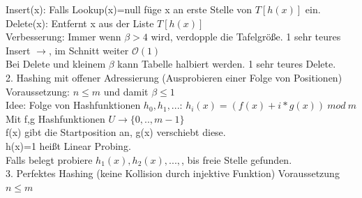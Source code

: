 \documentclass[a4paper]{article}
\newcommand{\oh}[1]{$\mathcal{O}(#1)$}
\begin{document}
Insert(x): Falls Lookup(x)=null füge x an erste Stelle von $T[h(x)]$ ein. \\
Delete(x): Entfernt x aus der Liste $T[h(x)]$\\
Verbesserung: Immer wenn $\beta >4 $ wird, verdopple die Tafelgröße. 1 sehr teures Insert $\rightarrow$, im Schnitt weiter \oh{1}\\
Bei Delete und kleinem $\beta$ kann Tabelle halbiert werden. 1 sehr teures Delete.\\
2. Hashing mit offener Adressierung (Ausprobieren einer Folge von Positionen)\\
Voraussetzung: $n\leq m$ und damit $\beta \leq 1$\\
Idee: Folge von Hashfunktionen $h_0, h_1,...$: $h_i(x) = (f(x) + i * g(x))\ mod\ m$\\
Mit f,g Hashfunktionen $U\rightarrow \{0,..,m-1\}$\\
f(x) gibt die Startposition an, g(x) verschiebt diese.\\
h(x)=1 heißt Linear Probing.\\
Falls belegt probiere $h_1(x), h_2(x),...,$, bis freie Stelle gefunden.\\
3. Perfektes Hashing (keine Kollision durch injektive Funktion) Voraussetzung $n\leq m$
\end{document}
